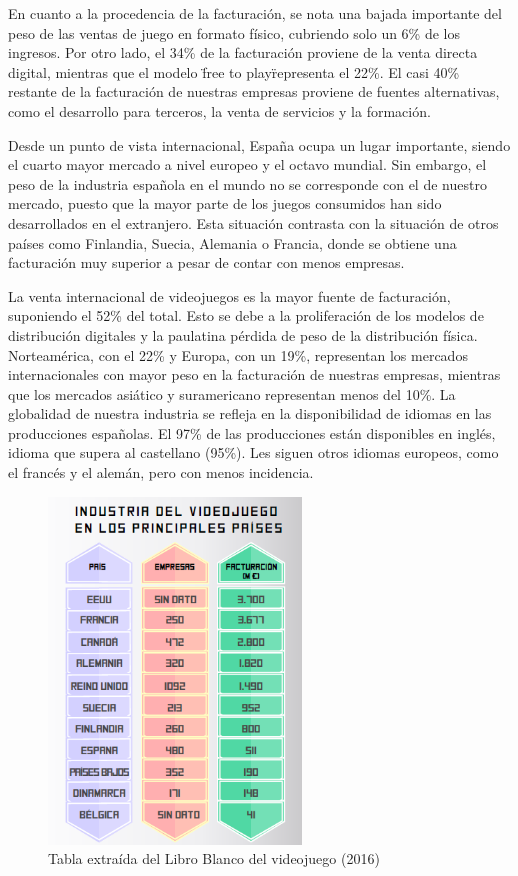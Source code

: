En cuanto a la procedencia de la facturación, se nota una bajada importante del peso de las ventas de juego en formato físico, cubriendo solo un 6\% de los ingresos. Por otro lado, el 34\% de la facturación proviene de la venta directa digital, mientras que el modelo \"free to play\" representa el 22\%. El casi 40\% restante de la facturación de nuestras empresas proviene de fuentes alternativas, como el desarrollo para terceros, la venta de servicios y la formación. 

Desde un punto de vista internacional, España ocupa un lugar importante, siendo el cuarto mayor mercado a nivel europeo y el octavo mundial. Sin embargo, el peso de la industria española en el mundo no se corresponde con el de nuestro mercado, puesto que la mayor parte de los juegos consumidos han sido desarrollados en el extranjero. Esta situación contrasta con la situación de otros países como Finlandia, Suecia, Alemania o Francia, donde se obtiene una facturación muy superior a pesar de contar con menos empresas.

La venta internacional de videojuegos es la mayor fuente de facturación, suponiendo el 52\% del total. Esto se debe a la proliferación de los modelos de distribución digitales y la paulatina pérdida de peso de la distribución física. Norteamérica, con el 22\% y Europa, con un 19\%, representan los mercados internacionales con mayor peso en la facturación de nuestras empresas, mientras que los mercados asiático y suramericano representan menos del 10\%. La globalidad de nuestra industria se refleja en la disponibilidad de idiomas en las producciones españolas. El 97\% de las producciones están disponibles en inglés, idioma que supera al castellano (95\%). Les siguen otros idiomas europeos, como el francés y el alemán, pero con menos incidencia. 

\begin{figure}[h]
    \centering
    \includegraphics[width=0.6\textwidth]{images/estadodelarte/mercado/comparativa-internacional}
    \caption{Tabla extraída del Libro Blanco del videojuego (2016)}
\end{figure}

